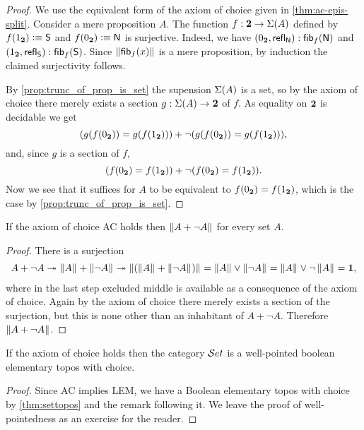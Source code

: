 \begin{proof}
We use the equivalent form of the axiom of choice given in \autoref{thm:ac-epis-split}.
Consider a mere proposition $A$.
The function $f:\mathbf{2}\to\Sigma(A)$ defined by
$f({1_{\mathbf{2}}}) \vcentcolon\equiv \mathsf{S}$ and $f({0_{\mathbf{2}}}) \vcentcolon\equiv \mathsf{N}$
is surjective.
Indeed, we have
${({0_{\mathbf{2}}},\mathsf{refl}_{\mathsf{N}})} : {\mathsf{fib}}_{f}(\mathsf{N})$
and ${({1_{\mathbf{2}}},\mathsf{refl}_{\mathsf{S}})} :{\mathsf{fib}}_{f}(\mathsf{S})$.
Since $\left\Vert {\mathsf{fib}}_{f}(x)\right\Vert_{}$ is a mere proposition, by induction the claimed surjectivity follows.

By \autoref{prop:trunc_of_prop_is_set} the supension $\Sigma(A)$
is a set, so by the axiom of choice there merely exists a
section $g: \Sigma(A) \to \mathbf{2}$ of $f$.
As equality on $\mathbf{2}$ is decidable we get
\begin{equation*}
 (g(f({0_{\mathbf{2}}}))= g(f({1_{\mathbf{2}}}))) +
 \lnot (g(f({0_{\mathbf{2}}}))= g(f({1_{\mathbf{2}}}))),
\end{equation*}
and, since $g$ is a section of $f$,
\begin{equation*}
(f({0_{\mathbf{2}}}) = f({1_{\mathbf{2}}})) +
\lnot (f({0_{\mathbf{2}}}) = f({1_{\mathbf{2}}})).
\end{equation*}
Now we see that it suffices for $A$ to be equivalent to
$f({0_{\mathbf{2}}}) = f({1_{\mathbf{2}}})$, which is the case by \autoref{prop:trunc_of_prop_is_set}.
\end{proof}

\begin{cor}\label{cor:ACtoLEM0}
  If the axiom of choice AC holds then $\left\Vert A + \neg A\right\Vert_{}$ for every set $A$.
\end{cor}

\begin{proof}
  There is a surjection
  \[
  A + \neg A \twoheadrightarrow \left\Vert A\right\Vert_{} + \left\Vert \neg A\right\Vert_{} \twoheadrightarrow
  \left\Vert (\left\Vert A\right\Vert_{} + \left\Vert \neg A\right\Vert_{})\right\Vert_{} = \left\Vert A\right\Vert_{} \vee \left\Vert \neg A\right\Vert_{} = \left\Vert A\right\Vert_{} \vee \neg \left\Vert A\right\Vert_{} = \mathbf{1},
  \]
  where in the last step excluded middle is available as a consequence of the axiom of choice.
  Again by the axiom of choice there merely exists a section of the surjection, but this
  is none other than an inhabitant of $A + \neg A$. Therefore $\left\Vert A+\neg A\right\Vert_{}$.
\end{proof}

\begin{thm}\label{thm:ETCS}
  If the axiom of choice holds then the category $\mathcal{S}et$ is a well-pointed boolean elementary topos with choice.  
\end{thm}

\begin{proof}
  Since AC implies LEM, we have a Boolean elementary topos with choice by \autoref{thm:settopos} and the remark following it.  We leave the proof of well-pointedness as
an exercise for the reader.
\end{proof}

